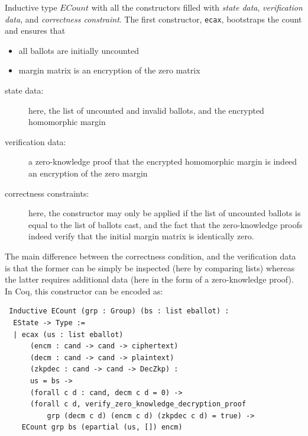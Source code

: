 Inductive type $ECount$ with all the constructors filled with \textit{state data}, 
\textit{verification data}, and \textit{correctness constraint}.  The first constructor, \texttt{ecax}, bootstraps
the count and ensures that 
\begin{itemize}
  \item all ballots are initially uncounted
  \item margin matrix is an encryption of the zero matrix
\end{itemize}

\begin{description}
  \item[state data:] here, the list of uncounted and invalid ballots,
  and the encrypted homomorphic margin
  \item[verification data:] a zero-knowledge proof that the encrypted
  homomorphic margin is indeed an encryption of the zero margin
  \item[correctness constraints:] here, the constructor may only be applied if
  the list of uncounted ballots is equal to the list of ballots
  cast, and the fact that the zero-knowledge proofs indeed verify
  that the initial margin matrix is identically zero.
\end{description}

\noindent
The main difference between the correctness condition, and the
verification data is that the former can be simply be inspected
(here by comparing lists) whereas the latter requires additional
data (here  in the form of a zero-knowledge proof). In Coq, 
this constructor can be encoded as:

\begin{verbatim}
 Inductive ECount (grp : Group) (bs : list eballot) : 
  EState -> Type :=
  | ecax (us : list eballot) 
      (encm : cand -> cand -> ciphertext)
      (decm : cand -> cand -> plaintext)
      (zkpdec : cand -> cand -> DecZkp) :
      us = bs ->
      (forall c d : cand, decm c d = 0) -> 
      (forall c d, verify_zero_knowledge_decryption_proof 
          grp (decm c d) (encm c d) (zkpdec c d) = true) ->
    ECount grp bs (epartial (us, []) encm)
\end{verbatim}



